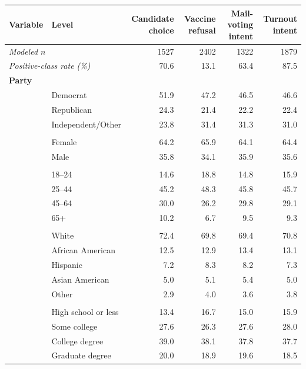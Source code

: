 \begin{tabular}{llrrrr}
\toprule
Variable & Level & Candidate choice & Vaccine refusal & Mail-voting intent & Turnout intent \\
\midrule
\multicolumn{2}{l}{\textit{Modeled $n$}} & 1527 & 2402 & 1322 & 1879 \\
\multicolumn{2}{l}{\textit{Positive-class rate (\%)}} & 70.6 & 13.1 & 63.4 & 87.5 \\
\midrule
\multicolumn{6}{l}{\textbf{Party}} \\
 & Democrat & 51.9 & 47.2 & 46.5 & 46.6 \\
 & Republican & 24.3 & 21.4 & 22.2 & 22.4 \\
 & Independent/Other & 23.8 & 31.4 & 31.3 & 31.0 \\
\addlinespace
\multicolumn{6}{l}{\textbf{Gender}} \\
 & Female & 64.2 & 65.9 & 64.1 & 64.4 \\
 & Male & 35.8 & 34.1 & 35.9 & 35.6 \\
\addlinespace
\multicolumn{6}{l}{\textbf{Age}} \\
 & 18--24 & 14.6 & 18.8 & 14.8 & 15.9 \\
 & 25--44 & 45.2 & 48.3 & 45.8 & 45.7 \\
 & 45--64 & 30.0 & 26.2 & 29.8 & 29.1 \\
 & 65+ & 10.2 & 6.7 & 9.5 & 9.3 \\
\addlinespace
\multicolumn{6}{l}{\textbf{Race / ethnicity}} \\
 & White & 72.4 & 69.8 & 69.4 & 70.8 \\
 & African American & 12.5 & 12.9 & 13.4 & 13.1 \\
 & Hispanic & 7.2 & 8.3 & 8.2 & 7.3 \\
 & Asian American & 5.0 & 5.1 & 5.4 & 5.0 \\
 & Other & 2.9 & 4.0 & 3.6 & 3.8 \\
\addlinespace
\multicolumn{6}{l}{\textbf{Education}} \\
 & High school or less & 13.4 & 16.7 & 15.0 & 15.9 \\
 & Some college & 27.6 & 26.3 & 27.6 & 28.0 \\
 & College degree & 39.0 & 38.1 & 37.8 & 37.7 \\
 & Graduate degree & 20.0 & 18.9 & 19.6 & 18.5 \\

\end{tabular}
